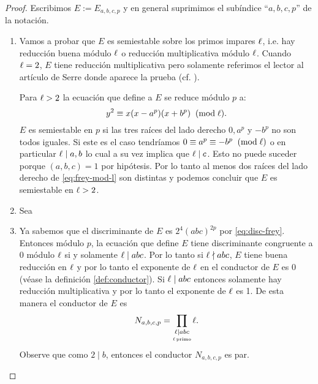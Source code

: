 \begin{proof} Escribimos $E:=E_{a,b,c,p}$ y en general suprimimos el subíndice ``$a,b,c,p$'' de la notación.
	\begin{enumerate}[label=(\emph{\roman*})]
		\item Vamos a probar que $E$ es semiestable sobre los primos impares $\ell$, i.e. hay reducción buena módulo $\ell$ o reducción multiplicativa módulo $\ell$. Cuando $\ell=2$, $E$ tiene reducción multiplicativa pero solamente referimos el lector al artículo de Serre donde aparece la prueba (cf. \cite[\S4.1.3]{Serre87}).
		
		Para $\ell>2$ la ecuación que define a $E$ se reduce módulo $p$ a:
		\begin{equation}\label{eq:frey-mod-l}
			y^2\equiv x(x-a^p)(x+b^p) \;\;(\mathrm{mod}\; \ell).
		\end{equation}
		$E$ es semiestable en $p$ si las tres raíces del lado derecho $0,a^p$ y $-b^p$ no son todos iguales. Si este es el caso tendríamos $0\equiv a^p\equiv -b^p\;\;(\mathrm{mod}\; \ell)$ o en particular $\ell\mid a,b$ lo cual a su vez implica que $\ell\mid c$. Esto no puede suceder porque $(a,b,c)=1$ por hipótesis. Por lo tanto al menos dos raíces del lado derecho de \eqref{eq:frey-mod-l} son distintas y podemos concluir que $E$ es semiestable en $\ell>2$.
		
		\item Sea
		
		\item Ya sabemos que el discriminante de $E$ es $2^4(abc)^{2p}$ por \eqref{eq:disc-frey}. Entonces módulo $p$, la ecuación que define $E$ tiene discriminante congruente a 0 módulo $\ell$ si y solamente $\ell\mid abc$. Por lo tanto si $\ell\nmid abc$, $E$ tiene buena reducción en $\ell$ y por lo tanto el exponente de $\ell$ en el conductor de $E$ es 0 (véase la definición \ref{def:conductor}). Si $\ell\mid abc$ entonces solamente hay reducción multiplicativa y por lo tanto el exponente de $\ell$ es 1. De esta manera el conductor de $E$ es
	\[
		N_{a,b,c,p}=\prod_{\underset{\ell\,\mathrm{primo}}{\ell\mid abc}}\ell.
	\]
	Observe que como $2\mid b$, entonces el conductor $N_{a,b,c,p}$ es par. 
	\end{enumerate}
\end{proof}

